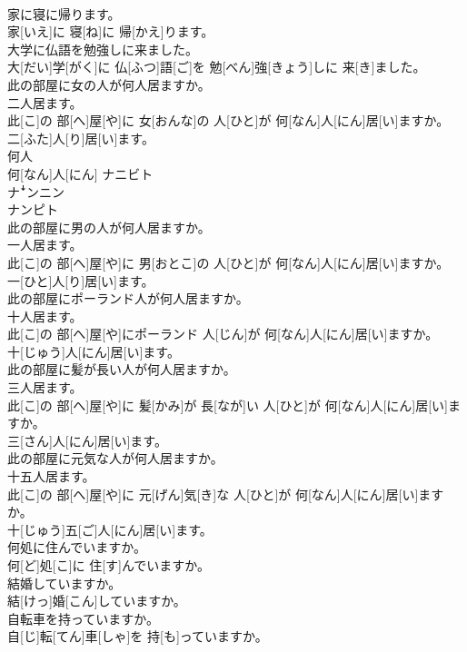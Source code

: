 \documentclass[8pt]{extreport}
\begin{document}
\begin{CJK}{UTF8}{min}
\\	家に寝に帰ります。	
\\	家[いえ]に 寝[ね]に 帰[かえ]ります。
\\	大学に仏語を勉強しに来ました。	
\\	大[だい]学[がく]に 仏[ふつ]語[ご]を 勉[べん]強[きょう]しに 来[き]ました。
\\	此の部屋に女の人が何人居ますか。 
\\	二人居ます。	
\\	此[こ]の 部[へ]屋[や]に 女[おんな]の 人[ひと]が 何[なん]人[にん]居[い]ますか。 
\\	二[ふた]人[り]居[い]ます。
\\	何人	
\\	何[なん]人[にん]	ナニビト 
\\	ナꜜンニン 
\\	ナンピト
\\	此の部屋に男の人が何人居ますか。 
\\	一人居ます。	
\\	此[こ]の 部[へ]屋[や]に 男[おとこ]の 人[ひと]が 何[なん]人[にん]居[い]ますか。 
\\	一[ひと]人[り]居[い]ます。
\\	此の部屋にポーランド人が何人居ますか。 
\\	十人居ます。	
\\	此[こ]の 部[へ]屋[や]にポーランド 人[じん]が 何[なん]人[にん]居[い]ますか。 
\\	十[じゅう]人[にん]居[い]ます。
\\	此の部屋に髪が長い人が何人居ますか。 
\\	三人居ます。	
\\	此[こ]の 部[へ]屋[や]に 髪[かみ]が 長[なが]い 人[ひと]が 何[なん]人[にん]居[い]ますか。 
\\	三[さん]人[にん]居[い]ます。
\\	此の部屋に元気な人が何人居ますか。 
\\	十五人居ます。	
\\	此[こ]の 部[へ]屋[や]に 元[げん]気[き]な 人[ひと]が 何[なん]人[にん]居[い]ますか。 
\\	十[じゅう]五[ご]人[にん]居[い]ます。
\\	何処に住んでいますか。	
\\	何[ど]処[こ]に 住[す]んでいますか。
\\	結婚していますか。	
\\	結[けっ]婚[こん]していますか。
\\	自転車を持っていますか。	
\\	自[じ]転[てん]車[しゃ]を 持[も]っていますか。

\end{CJK}
\end{document}
